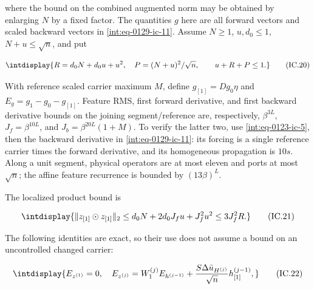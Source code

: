 
where the bound on the combined augmented norm may be obtained by enlarging \(N\) by a fixed factor. The quantities \(g\) here are all forward vectors and scaled backward vectors in \eqref{int:eq-0129-ic-11}. Assume \(N\ge1\), \(u,\allowbreak d_0\le1\), \(N+u\le\sqrt n\), and put


\begingroup\renewcommand{\theHequation}{intdisplay.319}
\begin{equation}
\intdisplay{
R=d_0N+d_0u+u^2,\quad P=(N+u)^2/\sqrt n,
 \qquad u+R+P\le1.
}
\tag{IC.20}
\label{int:eq-0138-ic-20}
\end{equation}
\endgroup


With reference scaled carrier maximum \(M\), define \(g_{[1]}=Dg_0\eta\) and \(E_g=g_1-g_0-g_{[1]}\). Feature RMS, first forward derivative, and first backward derivative bounds on the joining segment/reference are, respectively, \(\beta^{3L}\), \(J_f=\beta^{10L}\), and \(J_b=\beta^{20L}(1+M)\). To verify the latter two, use \eqref{int:eq-0123-ic-5}, then the backward derivative in \eqref{int:eq-0129-ic-11}: its forcing is a single reference carrier times the forward derivative, and its homogeneous propagation is \(10s\). Along a unit segment, physical operators are at most eleven and ports at most \(\sqrt n\); the affine feature recurrence is bounded by \((13\beta)^L\).



The localized product bound is


\begingroup\renewcommand{\theHequation}{intdisplay.320}
\begin{equation}
\intdisplay{
\|z_{[1]}\odot z_{[1]}\|_2
 \le d_0N+2d_0J_fu+J_f^2u^2\le3J_f^2R.
}
\tag{IC.21}
\label{int:eq-0139-ic-21}
\end{equation}
\endgroup


The following identities are exact, so their use does not assume a bound on an uncontrolled changed carrier:


\begingroup\renewcommand{\theHequation}{intdisplay.321}
\begin{equation}
\intdisplay{
E_{z^{(1)}}=0,\quad
 E_{z^{(j)}}=W_1^{(j)}E_{h^{(j-1)}}
        +\frac{S\Delta\bar u_{H^{(j)}}}{\sqrt n}h_{[1]}^{(j-1)},
}
\tag{IC.22}
\label{int:eq-0140-ic-22}
\end{equation}
\endgroup

